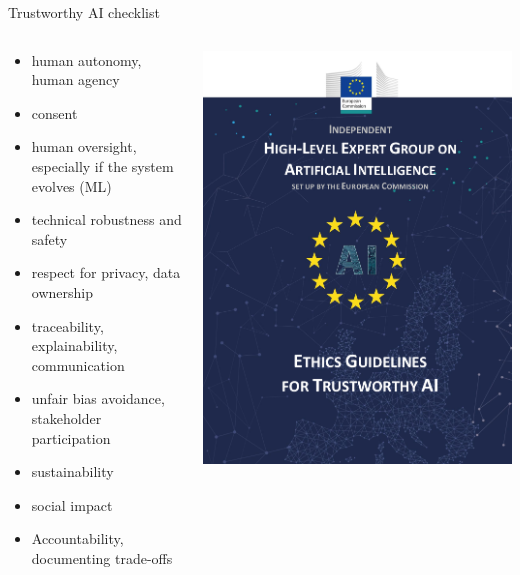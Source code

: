 \documentclass[xcolor=table,aspectratio=169]{beamer}
\begin{document}
\begin{frame}{Trustworthy AI checklist}
    \begin{columns}
        \begin{column}{0.6\linewidth}

    \begin{itemize}
        \item human autonomy, human agency
        \item consent
        \item human oversight, especially if the system evolves (ML)
        \item technical robustness and safety
        \item respect for privacy, data ownership
        \item traceability, explainability, communication
        \item unfair bias avoidance, stakeholder participation
        \item sustainability
        \item social impact
        \item Accountability, documenting trade-offs

    \end{itemize}
        \end{column}
        \begin{column}{0.4\linewidth}
            \begin{center}
                \includegraphics[width=0.8\columnwidth]{eu-ethics-guidelines}
            \end{center}
        \end{column}
    \end{columns}
\end{frame}
\end{document}

